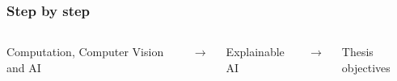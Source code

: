 \begin{frame}
    \frametitle{Step by step}
    \begin{columns}[c]
            \begin{center}
                Computation, Computer Vision and AI
            \end{center}
            \begin{center}
                $\rightarrow$
            \end{center}
            \begin{center}
                Explainable AI
            \end{center}
            \begin{center}
                $\rightarrow$                
            \end{center}
            \begin{center}
                Thesis objectives                
            \end{center}
    \end{columns}
\end{frame}
